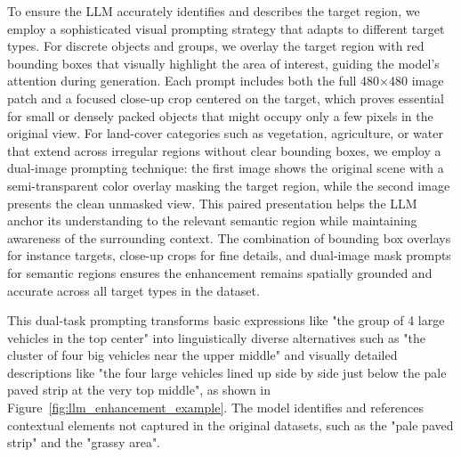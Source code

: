 To ensure the LLM accurately identifies and describes the target region, we employ a sophisticated visual prompting strategy that adapts to different target types. For discrete objects and groups, we overlay the target region with red bounding boxes that visually highlight the area of interest, guiding the model's attention during generation. Each prompt includes both the full 480×480 image patch and a focused close-up crop centered on the target, which proves essential for small or densely packed objects that might occupy only a few pixels in the original view. For land-cover categories such as vegetation, agriculture, or water that extend across irregular regions without clear bounding boxes, we employ a dual-image prompting technique: the first image shows the original scene with a semi-transparent color overlay masking the target region, while the second image presents the clean unmasked view. This paired presentation helps the LLM anchor its understanding to the relevant semantic region while maintaining awareness of the surrounding context. The combination of bounding box overlays for instance targets, close-up crops for fine details, and dual-image mask prompts for semantic regions ensures the enhancement remains spatially grounded and accurate across all target types in the dataset.

This dual-task prompting transforms basic expressions like "the group of 4 large vehicles in the top center" into linguistically diverse alternatives such as "the cluster of four big vehicles near the upper middle" and visually detailed descriptions like "the four large vehicles lined up side by side just below the pale paved strip at the very top middle", as shown in Figure~\ref{fig:llm_enhancement_example}. The model identifies and references contextual elements not captured in the original datasets, such as the "pale paved strip" and the "grassy area".

